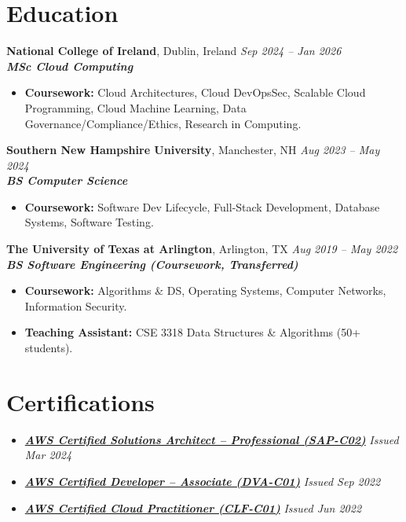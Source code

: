 \documentclass[10pt,a4paper]{article}
\begin{document}
\section*{Education}
\textbf{National College of Ireland}, Dublin, Ireland \hfill \textit{Sep 2024 -- Jan 2026}\\[-0.15em]
\textbf{\textit{MSc Cloud Computing}}\\[-0.25em]
\begin{itemize}
  \item \textbf{Coursework:} Cloud Architectures, Cloud DevOpsSec, Scalable Cloud Programming, Cloud Machine Learning, Data Governance/Compliance/Ethics, Research in Computing.
\end{itemize}
\vspace{0.20em}
\textbf{Southern New Hampshire University}, Manchester, NH \hfill \textit{Aug 2023 -- May 2024}\\[-0.15em]
\textbf{\textit{BS Computer Science}}\\[-0.25em]
\begin{itemize}
  \item \textbf{Coursework:} Software Dev Lifecycle, Full-Stack Development, Database Systems, Software Testing.
\end{itemize}
\vspace{0.20em}
\textbf{The University of Texas at Arlington}, Arlington, TX \hfill \textit{Aug 2019 -- May 2022}\\[-0.15em]
\textbf{\textit{BS Software Engineering (Coursework, Transferred)}}\\[-0.25em]
\begin{itemize}
  \item \textbf{Coursework:} Algorithms \& DS, Operating Systems, Computer Networks, Information Security.
  \item \textbf{Teaching Assistant:} CSE 3318 Data Structures \& Algorithms (50+ students).
\end{itemize}
\section*{Certifications}
\begin{itemize}
  \item \href{https://www.credly.com/badges/6e22a6c0-9922-49d5-b59f-34cc593c82c3/public_url}{\textbf{\textit{AWS Certified Solutions Architect -- Professional (SAP-C02)}}} \hfill \textit{Issued Mar 2024}
  \item \href{https://www.credly.com/badges/84671bf4-ce9f-4d8b-a0de-0ef606ad5646/public_url}{\textbf{\textit{AWS Certified Developer -- Associate (DVA-C01)}}} \hfill \textit{Issued Sep 2022}
  \item \href{https://www.credly.com/badges/e671b9de-e72a-48cb-82fc-33776c285174/public_url}{\textbf{\textit{AWS Certified Cloud Practitioner (CLF-C01)}}} \hfill \textit{Issued Jun 2022}
\end{itemize}
\end{document}
